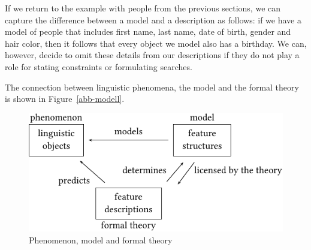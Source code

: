 If we return to the example with people from the previous sections, we can capture the difference between a model and a description as follows:
if we have a model of people that includes first name, last name, date of birth, gender and hair color, then it follows that every object we model also has a birthday.
We can, however, decide to omit these details from our descriptions if they do not play a role for
stating constraints or formulating searches.

The connection between linguistic phenomena, the model and the formal theory is shown in Figure~\vref{abb-modell}.
\begin{figure}
\centerline{%
\includegraphics{Figures/model-theory-phenomenon-crop}
}
\caption{\label{abb-modell}Phenomenon, model and formal theory}
\end{figure}%
